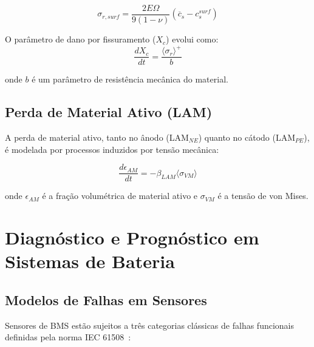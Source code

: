 \documentclass[
    12pt,
    openright,
    twoside,
    a4paper,
    brazil,
    english
]{abntex2}
\begin{document}
\begin{equation}
  \sigma_{r,surf} = \frac{2E\Omega}{9(1-\nu)}
  \left(\overline{c}_s - c_s^{surf}\right)
\end{equation}

O parâmetro de dano por fissuramento ($X_c$) evolui como:
\begin{equation}
  \frac{dX_c}{dt} = \frac{\langle \sigma_r \rangle^+}{b}
\end{equation}

onde $b$ é um parâmetro de resistência mecânica do material.

\subsection{Perda de Material Ativo (LAM)}

A perda de material ativo, tanto no ânodo (LAM$_{NE}$) quanto no cátodo
(LAM$_{PE}$), é modelada por processos induzidos por tensão mecânica:

\begin{equation}
  \frac{d\epsilon_{AM}}{dt} = -\beta_{LAM}\langle \sigma_{VM}\rangle
\end{equation}

onde $\epsilon_{AM}$ é a fração volumétrica de material ativo e
$\sigma_{VM}$ é a tensão de von Mises.

\section{Diagnóstico e Prognóstico em Sistemas de Bateria}

\subsection{Modelos de Falhas em Sensores}

Sensores de BMS estão sujeitos a três categorias clássicas de falhas funcionais
definidas pela norma IEC 61508~\cite{iec61508}:
\end{document}
